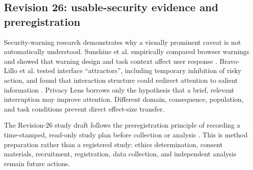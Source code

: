 

\subsection{Revision 26: usable-security evidence and preregistration}

Security-warning research demonstrates why a visually prominent caveat is not automatically understood. Sunshine et al. empirically compared browser warnings and showed that warning design and task context affect user response \cite{sunshine2009cryingwolf}. Bravo-Lillo et al. tested interface ``attractors'', including temporary inhibition of risky action, and found that interaction structure could redirect attention to salient information \cite{bravolillo2013attention}. Privacy Lens borrows only the hypothesis that a brief, relevant interruption may improve attention. Different domain, consequence, population, and task conditions prevent direct effect-size transfer.

The Revision-26 study draft follows the preregistration principle of recording a time-stamped, read-only study plan before collection or analysis \cite{osfpreregistration2026}. This is method preparation rather than a registered study: ethics determination, consent materials, recruitment, registration, data collection, and independent analysis remain future actions.
